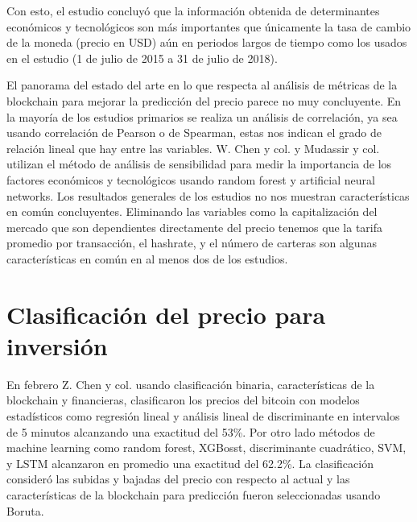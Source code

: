 Con esto, el estudio concluyó que la información obtenida de determinantes económicos y tecnológicos son más importantes que únicamente la tasa de cambio de la moneda (precio en USD) aún en periodos largos de tiempo como los usados en el estudio (1 de julio de 2015 a 31 de julio de 2018). 

El panorama del estado del arte en lo que respecta al análisis de métricas de la blockchain para mejorar la predicción del precio parece no muy concluyente. En la mayoría de los estudios primarios se realiza un análisis de correlación, ya sea usando correlación de Pearson o de Spearman, estas nos indican el grado de relación lineal que hay entre las variables. W. Chen y col. \parencite*{chenMachineLearningModel2021} y Mudassir y col. \parencite*{ mudassirTimeseriesForecastingBitcoin2020} utilizan el método de análisis de sensibilidad para medir la importancia de los factores económicos y tecnológicos usando random forest y artificial neural networks. Los resultados generales de los estudios no nos muestran características en común concluyentes. Eliminando las variables como la capitalización del mercado que son dependientes directamente del precio tenemos que la tarifa promedio por transacción, el hashrate, y el número de carteras son algunas características en común en al menos dos de los estudios.



\section{Clasificación del precio para inversión}
 
 
En febrero Z. Chen y col. \parencite*{chenBitcoinPricePrediction2020} usando clasificación binaria, características de la blockchain y financieras, clasificaron los precios del bitcoin con modelos estadísticos como regresión lineal y análisis lineal de discriminante en intervalos de 5 minutos alcanzando una exactitud del 53\%. Por otro lado métodos de machine learning como random forest, XGBosst, discriminante cuadrático, SVM, y LSTM alcanzaron en promedio una exactitud del 62.2\%.
La clasificación consideró las subidas y bajadas del precio con respecto al actual y las características de la blockchain para predicción fueron seleccionadas usando Boruta. 


